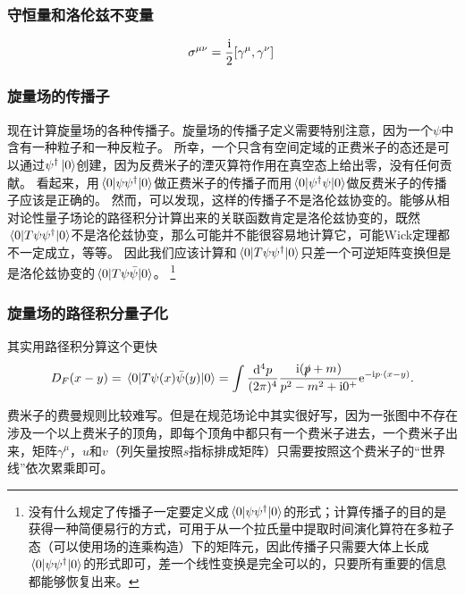 \subsubsection{守恒量和洛伦兹不变量}

\begin{equation}
    \sigma^{\mu \nu} = \frac{\ii}{2} \comm*{\gamma^\mu}{\gamma^\nu}
\end{equation}

\subsubsection{旋量场的传播子}

现在计算旋量场的各种传播子。旋量场的传播子定义需要特别注意，因为一个$\psi$中含有一种粒子和一种反粒子。
所幸，一个只含有空间定域的正费米子的态还是可以通过$\psi^\dagger \ket{0}$创建，因为反费米子的湮灭算符作用在真空态上给出零，没有任何贡献。
看起来，用$\mel*{0}{\psi \psi^\dagger}{0}$做正费米子的传播子而用$\mel*{0}{\psi^\dagger \psi}{0}$做反费米子的传播子应该是正确的。
然而，可以发现，这样的传播子不是洛伦兹协变的。能够从相对论性量子场论的路径积分计算出来的关联函数肯定是洛伦兹协变的，既然$\mel*{0}{T \psi \psi^\dagger}{0}$不是洛伦兹协变，那么可能并不能很容易地计算它，可能Wick定理都不一定成立，等等。
因此我们应该计算和$\mel*{0}{T \psi \psi^\dagger}{0}$只差一个可逆矩阵变换但是是洛伦兹协变的$\mel*{0}{T \psi \bar{\psi}}{0}$。%
\footnote{
    没有什么规定了传播子一定要定义成$\mel*{0}{\psi \psi^\dagger}{0}$的形式；计算传播子的目的是获得一种简便易行的方式，可用于从一个拉氏量中提取时间演化算符在多粒子态（可以使用场的连乘构造）下的矩阵元，因此传播子只需要大体上长成$\mel*{0}{\psi \psi^\dagger}{0}$的形式即可，差一个线性变换是完全可以的，只要所有重要的信息都能够恢复出来。
}%

\subsubsection{旋量场的路径积分量子化}

其实用路径积分算这个更快
\begin{equation}
    D_F(x-y) = \mel{0}{T \psi(x) \bar{\psi}(y)}{0} = \int \frac{\dd[4]{p}}{(2\pi)^4} \frac{\mathrm{i} (\slashed{p} + m)}{p^2 - m^2 + \mathrm{i} 0^+} \mathrm{e}^{- \mathrm{i} p \cdot (x- y)}.
\end{equation}

费米子的费曼规则比较难写。但是在规范场论中其实很好写，因为一张图中不存在涉及一个以上费米子的顶角，即每个顶角中都只有一个费米子进去，一个费米子出来，矩阵$\gamma^\mu$，$u$和$v$（列矢量按照$s$指标排成矩阵）只需要按照这个费米子的“世界线”依次累乘即可。

